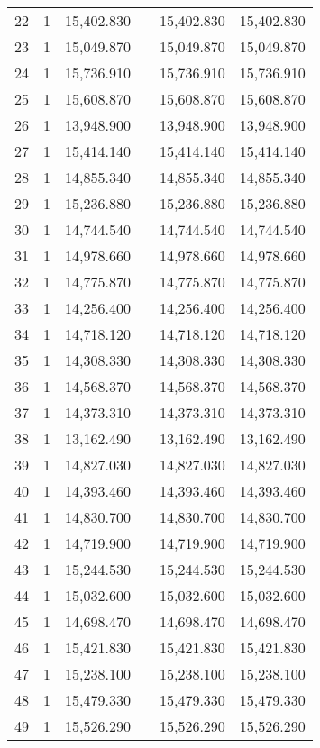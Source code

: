 \begin{table}[!htbp]
\begin{tabular}{@{\extracolsep{5pt}}lccccc}
22 & 1 & 15,402.830 &  & 15,402.830 & 15,402.830 \\ 
23 & 1 & 15,049.870 &  & 15,049.870 & 15,049.870 \\ 
24 & 1 & 15,736.910 &  & 15,736.910 & 15,736.910 \\ 
25 & 1 & 15,608.870 &  & 15,608.870 & 15,608.870 \\ 
26 & 1 & 13,948.900 &  & 13,948.900 & 13,948.900 \\ 
27 & 1 & 15,414.140 &  & 15,414.140 & 15,414.140 \\ 
28 & 1 & 14,855.340 &  & 14,855.340 & 14,855.340 \\ 
29 & 1 & 15,236.880 &  & 15,236.880 & 15,236.880 \\ 
30 & 1 & 14,744.540 &  & 14,744.540 & 14,744.540 \\ 
31 & 1 & 14,978.660 &  & 14,978.660 & 14,978.660 \\ 
32 & 1 & 14,775.870 &  & 14,775.870 & 14,775.870 \\ 
33 & 1 & 14,256.400 &  & 14,256.400 & 14,256.400 \\ 
34 & 1 & 14,718.120 &  & 14,718.120 & 14,718.120 \\ 
35 & 1 & 14,308.330 &  & 14,308.330 & 14,308.330 \\ 
36 & 1 & 14,568.370 &  & 14,568.370 & 14,568.370 \\ 
37 & 1 & 14,373.310 &  & 14,373.310 & 14,373.310 \\ 
38 & 1 & 13,162.490 &  & 13,162.490 & 13,162.490 \\ 
39 & 1 & 14,827.030 &  & 14,827.030 & 14,827.030 \\ 
40 & 1 & 14,393.460 &  & 14,393.460 & 14,393.460 \\ 
41 & 1 & 14,830.700 &  & 14,830.700 & 14,830.700 \\ 
42 & 1 & 14,719.900 &  & 14,719.900 & 14,719.900 \\ 
43 & 1 & 15,244.530 &  & 15,244.530 & 15,244.530 \\ 
44 & 1 & 15,032.600 &  & 15,032.600 & 15,032.600 \\ 
45 & 1 & 14,698.470 &  & 14,698.470 & 14,698.470 \\ 
46 & 1 & 15,421.830 &  & 15,421.830 & 15,421.830 \\ 
47 & 1 & 15,238.100 &  & 15,238.100 & 15,238.100 \\ 
48 & 1 & 15,479.330 &  & 15,479.330 & 15,479.330 \\ 
49 & 1 & 15,526.290 &  & 15,526.290 & 15,526.290 \\ 

\end{tabular}
\end{table}

